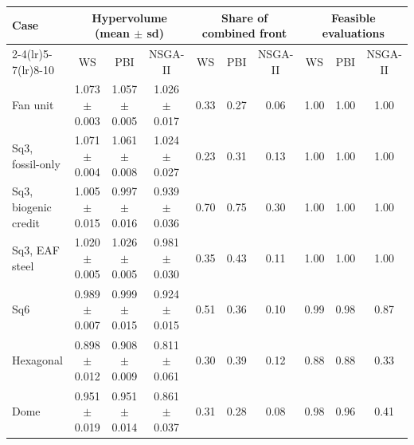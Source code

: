 \begin{tabular}{lccc ccc ccc}
\toprule
Case & \multicolumn{3}{c}{Hypervolume (mean $\pm$ sd)} & \multicolumn{3}{c}{Share of combined front} & \multicolumn{3}{c}{Feasible evaluations} \\
\cmidrule(lr){2-4}\cmidrule(lr){5-7}\cmidrule(lr){8-10}
 & WS & PBI & NSGA-II & WS & PBI & NSGA-II & WS & PBI & NSGA-II \\
\midrule
Fan unit & 1.073 $\pm$ 0.003 & 1.057 $\pm$ 0.005 & 1.026 $\pm$ 0.017 & 0.33 & 0.27 & 0.06 & 1.00 & 1.00 & 1.00 \\
Sq3, fossil-only & 1.071 $\pm$ 0.004 & 1.061 $\pm$ 0.008 & 1.024 $\pm$ 0.027 & 0.23 & 0.31 & 0.13 & 1.00 & 1.00 & 1.00 \\
Sq3, biogenic credit & 1.005 $\pm$ 0.015 & 0.997 $\pm$ 0.016 & 0.939 $\pm$ 0.036 & 0.70 & 0.75 & 0.30 & 1.00 & 1.00 & 1.00 \\
Sq3, EAF steel & 1.020 $\pm$ 0.005 & 1.026 $\pm$ 0.005 & 0.981 $\pm$ 0.030 & 0.35 & 0.43 & 0.11 & 1.00 & 1.00 & 1.00 \\
Sq6 & 0.989 $\pm$ 0.007 & 0.999 $\pm$ 0.015 & 0.924 $\pm$ 0.015 & 0.51 & 0.36 & 0.10 & 0.99 & 0.98 & 0.87 \\
Hexagonal & 0.898 $\pm$ 0.012 & 0.908 $\pm$ 0.009 & 0.811 $\pm$ 0.061 & 0.30 & 0.39 & 0.12 & 0.88 & 0.88 & 0.33 \\
Dome & 0.951 $\pm$ 0.019 & 0.951 $\pm$ 0.014 & 0.861 $\pm$ 0.037 & 0.31 & 0.28 & 0.08 & 0.98 & 0.96 & 0.41 \\
\bottomrule
\end{tabular}